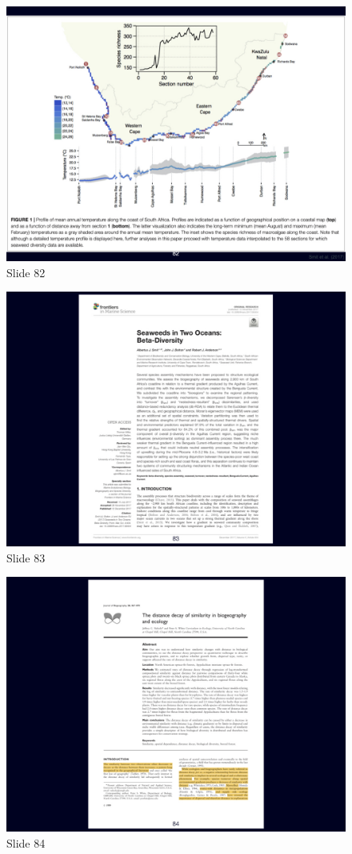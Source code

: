 \documentclass[
  10pt,
]{book}
\begin{document}
\begin{figure}[ht]
\centering
\includegraphics[width=0.8\linewidth]{../images/BDC334/BDC334-082.jpeg}
\caption*{Slide 82}
\end{figure}

\begin{figure}[ht]
\centering
\includegraphics[width=0.8\linewidth]{../images/BDC334/BDC334-083.jpeg}
\caption*{Slide 83}
\end{figure}

\begin{figure}[ht]
\centering
\includegraphics[width=0.8\linewidth]{../images/BDC334/BDC334-084.jpeg}
\caption*{Slide 84}
\end{figure}
\end{document}

